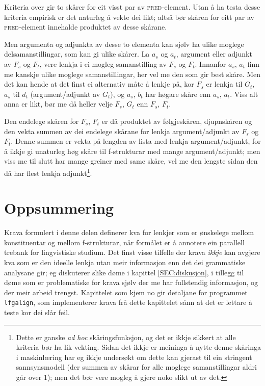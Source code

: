 \documentclass[12pt,a4paper,oneside,draft]{report}
\newcommand{\F}[2]{\textsc{#1}\ensuremath{_{#2}}}
\newcommand{\PRED}{\F{pred}{}}
\begin{document}
Kriteria over gir to skårer for eit visst par av \PRED{}-element. Utan å
ha testa desse kriteria empirisk er det naturleg å vekte dei likt;
altså bør skåren for eitt par av \PRED{}-element innehalde produktet av
desse skårane.

Men argumenta og adjunkta av desse to elementa kan sjølv ha ulike
moglege delsamanstillingar, som kan gi ulike skårer. La $a_s$ og
$a_t$, argument eller adjunkt av $F_s$ og $F_t$, vere lenkja i ei
mogleg samanstilling av $F_s$ og $F_t$. Innanfor $a_s$, $a_t$ finn me
kanskje ulike moglege samanstillingar, her vel me den som gir best
skåre. Men det kan hende at det finst ei alternativ måte å lenkje på,
kor $F_s$ er lenkja til $G_t$, $a_s$ til $d_t$ (argument/adjunkt av
$G_t$), og $a_s$, $b_t$ har høgare skåre enn $a_s$, $a_t$. Viss alt
anna er likt, bør me då heller velje $F_s$, $G_t$ enn $F_s$, $F_t$.

Den endelege skåren for $F_s$, $F_t$ er då produktet av følgjeskåren,
djupnskåren og den vekta summen av dei endelege skårane for lenkja
argument/adjunkt av $F_s$ og $F_t$. Denne summen er vekta på lengden
av lista med lenkja argument/adjunkt, for å ikkje gi unaturleg høg
skåre til f-strukturar med mange argument/adjunkt; men viss me til
slutt har mange greiner med same skåre, vel me den lengste sidan den
då har flest lenkja adjunkt\footnote{Dette er ganske \emph{ad hoc} skåringsfunksjon, og det er ikkje
        sikkert at alle kriteria bør ha lik vekting.  Sidan det ikkje
        er meininga å nytte denne skåringa i maskinlæring har eg ikkje
        undersøkt om dette kan gjerast til ein stringent
        sannsynsmodell (der summen av skårar for alle moglege
        samanstillingar aldri går over 1); men det bør vere mogleg å
        gjere noko slikt ut av det. }.



\section{Oppsummering}
\label{sec-3.9}

Krava formulert i denne delen definerer kva for lenkjer som er
ønskelege mellom konstituentar og mellom f-strukturar, når formålet er
å annotere ein parallell trebank for lingvistiske studium. Det finst
visse tilfelle der krava \emph{ikkje} kan avgjere kva som er den ideelle
lenkja utan meir informasjon enn det dei grammatiske analysane gir; eg
diskuterer slike døme i kapittel \ref{SEC:diskusjon}, i tillegg til
døme som er problematiske for krava sjølv der me har fullstendig
informasjon, og der meir arbeid trengst. Kapittelet som kjem no gir
detaljane for programmet \texttt{lfgalign}, som implementerer krava frå dette
kapittelet sånn at det er lettare å teste kor dei slår feil.
\end{document}
